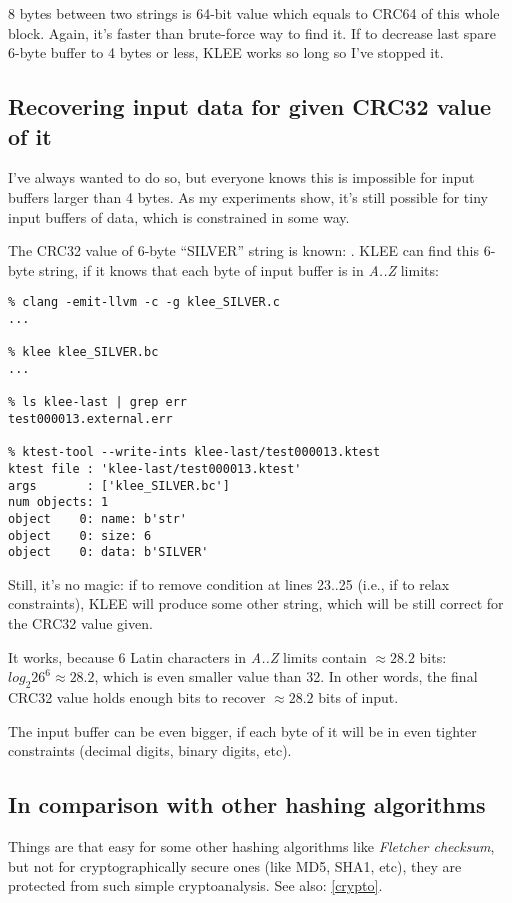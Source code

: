 8 bytes between two strings is 64-bit value which equals to CRC64 of this whole block.
Again, it's faster than brute-force way to find it.
If to decrease last spare 6-byte buffer to 4 bytes or less, KLEE works so long so I've stopped it.

\subsection{Recovering input data for given CRC32 value of it}

I've always wanted to do so, but everyone knows this is impossible for input buffers larger than 4 bytes.
As my experiments show, it's still possible for tiny input buffers of data, which is constrained in some way.

The CRC32 value of 6-byte ``SILVER'' string is known: .
KLEE can find this 6-byte string, if it knows that each byte of input buffer is in \textit{A..Z} limits:



\begin{lstlisting}
% clang -emit-llvm -c -g klee_SILVER.c
...

% klee klee_SILVER.bc
...

% ls klee-last | grep err
test000013.external.err

% ktest-tool --write-ints klee-last/test000013.ktest
ktest file : 'klee-last/test000013.ktest'
args       : ['klee_SILVER.bc']
num objects: 1
object    0: name: b'str'
object    0: size: 6
object    0: data: b'SILVER'
\end{lstlisting}

Still, it's no magic: if to remove condition at lines 23..25 (i.e., if to relax constraints),
KLEE will produce some other string, which will be still correct for the CRC32 value given.

It works, because 6 Latin characters in \textit{A..Z} limits contain $\approx 28.2$ bits:
$log_2{26^6} \approx 28.2$, which is even smaller value than 32.
In other words, the final CRC32 value holds enough bits to recover $\approx 28.2$ bits of input.

The input buffer can be even bigger, if each byte of it will be in even tighter
constraints (decimal digits, binary digits, etc).

\subsection{In comparison with other hashing algorithms}

Things are that easy for some other hashing algorithms like \textit{Fletcher checksum},
but not for cryptographically secure ones (like MD5, SHA1, etc), they are protected from such simple cryptoanalysis.
See also: \ref{crypto}.

